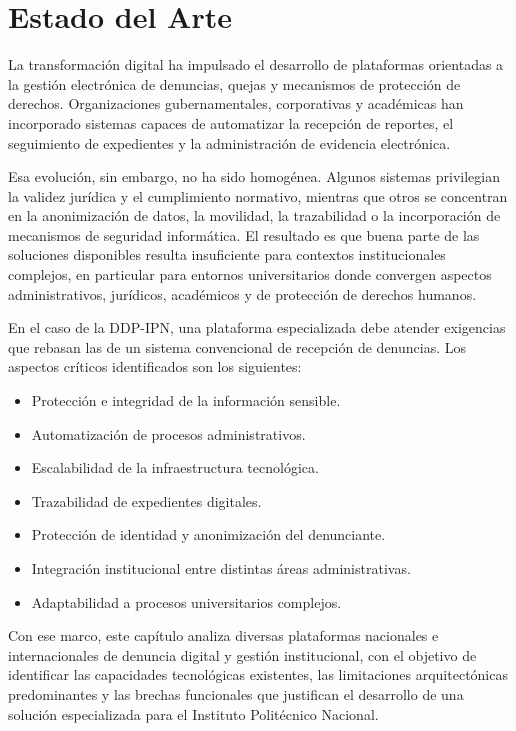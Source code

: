 	\section{Estado del Arte}
	La transformación digital ha impulsado el desarrollo de plataformas orientadas a la gestión
	electrónica de denuncias, quejas y mecanismos de protección de derechos. Organizaciones
	gubernamentales, corporativas y académicas han incorporado sistemas capaces de automatizar la
	recepción de reportes, el seguimiento de expedientes y la administración de evidencia electrónica.
	
	Esa evolución, sin embargo, no ha sido homogénea. Algunos sistemas privilegian la validez jurídica y
	el cumplimiento normativo, mientras que otros se concentran en la anonimización de datos, la
	movilidad, la trazabilidad o la incorporación de mecanismos de seguridad informática. El resultado es
	que buena parte de las soluciones disponibles resulta insuficiente para contextos institucionales
	complejos, en particular para entornos universitarios donde convergen aspectos administrativos,
	jurídicos, académicos y de protección de derechos humanos.
	
	En el caso de la DDP-IPN, una plataforma especializada debe atender exigencias que rebasan las de un
	sistema convencional de recepción de denuncias. Los aspectos críticos identificados son los
	siguientes:
	
	\begin{itemize}
		\item Protección e integridad de la información sensible.
		\item Automatización de procesos administrativos.
		\item Escalabilidad de la infraestructura tecnológica.
		\item Trazabilidad de expedientes digitales.
		\item Protección de identidad y anonimización del denunciante.
		\item Integración institucional entre distintas áreas administrativas.
		\item Adaptabilidad a procesos universitarios complejos.
	\end{itemize}
	
	Con ese marco, este capítulo analiza diversas plataformas nacionales e internacionales de denuncia
	digital y gestión institucional, con el objetivo de identificar las capacidades tecnológicas
	existentes, las limitaciones arquitectónicas predominantes y las brechas funcionales que justifican
	el desarrollo de una solución especializada para el Instituto Politécnico Nacional.
	
